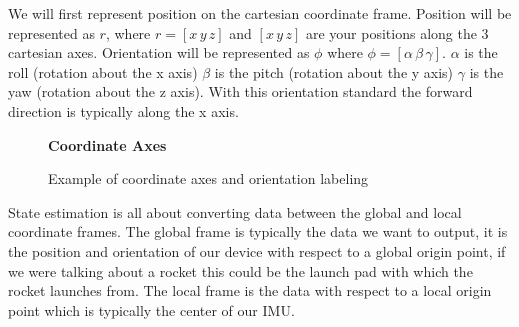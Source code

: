 \documentclass[12pt,letterpaper,boxed]{hmcpset}
\begin{document}
We will first represent position on the cartesian coordinate frame. Position will be represented as $r$, where $r = [x\, y\, z]$ and $[x\, y\, z]$ are your positions along the 3 cartesian axes. Orientation will be represented as $\phi$ where $\phi = [\alpha\, \beta\, \gamma]$. $\alpha$ is the roll (rotation about the x axis) $\beta$ is the pitch (rotation about the y axis) $\gamma$ is the yaw (rotation about the z axis). With this orientation standard the forward direction is typically along the x axis.
\begin{figure}[H]
	\centering
	\textbf{Coordinate Axes}\par\medskip
	\caption{Example of coordinate axes and orientation labeling}
\end{figure}

State estimation is all about converting data between the global and local coordinate frames. The global frame is typically the data we want to output, it is the position and orientation of our device with respect to a global origin point, if we were talking about a rocket this could be the launch pad with which the rocket launches from. The local frame is the data with respect to a local origin point which is typically the center of our IMU. 
\end{document}
